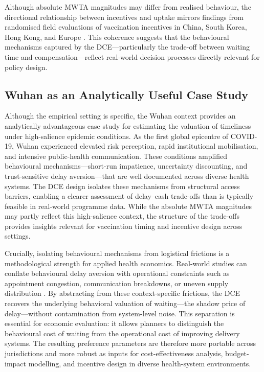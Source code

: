 \documentclass[12pt]{article}
\begin{document}
Although absolute MWTA magnitudes may differ from realised behaviour, the directional 
relationship between incentives and uptake mirrors findings from randomised field 
evaluations of vaccination incentives in China, South Korea, Hong Kong, and Europe 
\citep{Hu2022,Yip2022HKincentives,Kim2022SKincentive,CamposMercade2021}. This coherence 
suggests that the behavioural mechanisms captured by the DCE—particularly the trade-off 
between waiting time and compensation—reflect real-world decision processes directly 
relevant for policy design.



\subsection{Wuhan as an Analytically Useful Case Study}

Although the empirical setting is specific, the Wuhan context provides an analytically 
advantageous case study for estimating the valuation of timeliness under high-salience 
epidemic conditions. As the first global epicentre of COVID-19, Wuhan experienced elevated 
risk perception, rapid institutional mobilisation, and intensive public-health communication. 
These conditions amplified behavioural mechanisms—short-run impatience, uncertainty 
discounting, and trust-sensitive delay aversion—that are well documented across diverse 
health systems. The DCE design isolates these mechanisms from structural access barriers, 
enabling a clearer assessment of delay–cash trade-offs than is typically feasible in 
real-world programme data. While the absolute MWTA magnitudes may partly reflect this 
high-salience context, the structure of the trade-offs provides insights relevant for 
vaccination timing and incentive design across settings.

Crucially, isolating behavioural mechanisms from logistical frictions is a methodological 
strength for applied health economics. Real-world studies can conflate behavioural delay 
aversion with operational constraints such as appointment congestion, communication 
breakdowns, or uneven supply distribution \citep{WHO2022_QualityImmunizationServices,
Peacocke2021_GlobalAccessCovidVaccines}. By abstracting from these context-specific 
frictions, the DCE recovers the underlying behavioral valuation of waiting—the shadow price 
of delay—without contamination from system-level noise. This separation is essential for 
economic evaluation: it allows planners to distinguish the behavioural cost of waiting from 
the operational cost of improving delivery systems. The resulting preference parameters are 
therefore more portable across jurisdictions and more robust as inputs for cost-effectiveness 
analysis, budget-impact modelling, and incentive design in diverse health-system 
environments.
\end{document}
